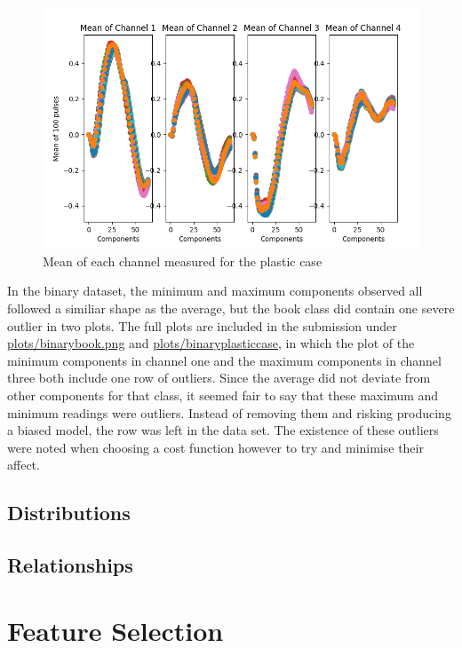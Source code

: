 \documentclass[12pt]{article}
\begin{document}
\begin{figure}[!ht]
	\centering
	\includegraphics[width=\linewidth]{images/plasticcase}
	\caption{Mean of each channel measured for the plastic case}
	\label{fig:plasticcase}
\end{figure}

In the binary dataset, the minimum and maximum components observed all followed a similiar shape as the average, but the book class did contain one severe outlier in two plots. The full plots are included in the submission under \url{plots/binarybook.png} and \url{plots/binaryplasticcase}, in which the plot of the minimum components in channel one and the maximum components in channel three both include one row of outliers. Since the average did not deviate from other components for that class, it seemed fair to say that these maximum and minimum readings were outliers. Instead of removing them and risking producing a biased model, the row was left in the data set. The existence of these outliers were noted when choosing a cost function however to try and minimise their affect.



\subsection{Distributions}

\subsection{Relationships}

\section{Feature Selection}
\end{document}
